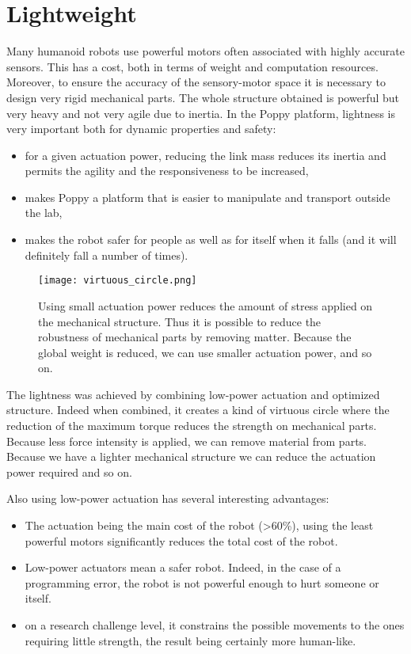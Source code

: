 \section{Lightweight} %
\label{sec:lightweight-robot}

Many humanoid robots use powerful motors often associated with highly accurate sensors. This has a cost, both in terms of weight and computation resources. Moreover, to ensure the accuracy of the sensory-motor space it is necessary to design very rigid mechanical parts. The whole structure obtained is powerful but very heavy and not very agile due to inertia.
In the Poppy platform, lightness is very important both for dynamic properties and safety:
\begin{itemize}
    \item for a given actuation power, reducing the link mass reduces its inertia and permits the agility and the responsiveness to be increased,
    \item makes Poppy a platform that is easier to manipulate and transport outside the lab,
    \item makes the robot safer for people as well as for itself when it falls (and it will definitely fall a number of times).
\end{itemize}

\begin{figure}[!t]
    \centering
        \texttt{[image: virtuous\_circle.png]}
    \caption{Using small actuation power reduces the amount of stress applied on the mechanical structure. Thus it is possible to reduce the robustness of mechanical parts by removing matter. Because the global weight is reduced, we can use smaller actuation power, and so on.}
    \label{fig:virtuous_circle}
\end{figure}

The lightness was achieved by combining low-power actuation and optimized structure. Indeed when combined, it creates a kind of virtuous circle where the reduction of the maximum torque reduces the strength on mechanical parts. Because less force intensity is applied, we can remove material from parts. Because we have a lighter mechanical structure we can reduce the actuation power required and so on.


Also using low-power actuation has several interesting advantages:

\begin{itemize}
    \item The actuation being the main cost of the robot (>60\%), using the least powerful motors significantly reduces the total cost of the robot.
    \item Low-power actuators mean a safer robot. Indeed, in the case of a programming error, the robot is not powerful enough to hurt someone or itself.
    \item on a research challenge level, it constrains the possible movements to the ones requiring little strength, the result being certainly more human-like.
\end{itemize}

